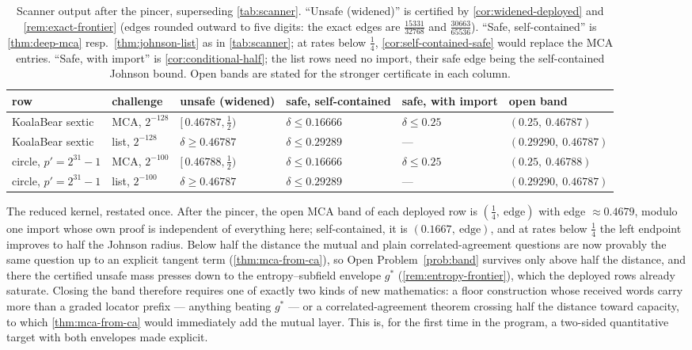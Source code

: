 \documentclass[11pt]{article}
\theoremstyle{definition}
\theoremstyle{remark}
\begin{document}
\begin{table}[t]
\centering\footnotesize
\setlength{\tabcolsep}{4pt}
\begin{tabular}{@{}llllll@{}}
\toprule
row & challenge & unsafe \textup{(widened)} & safe, self-contained & safe, with import & open band \\
\midrule
KoalaBear sextic & MCA, $2^{-128}$ & $[\,0.46787,\tfrac12)$ & $\delta\le0.16666$ & $\delta\le0.25$ & $(0.25,\ 0.46787)$ \\
KoalaBear sextic & list, $2^{-128}$ & $\delta\ge0.46787$ & $\delta\le0.29289$ & --- & $(0.29290,\ 0.46787)$ \\
circle, $p'{=}2^{31}{-}1$ & MCA, $2^{-100}$ & $[\,0.46788,\tfrac12)$ & $\delta\le0.16666$ & $\delta\le0.25$ & $(0.25,\ 0.46788)$ \\
circle, $p'{=}2^{31}{-}1$ & list, $2^{-100}$ & $\delta\ge0.46787$ & $\delta\le0.29289$ & --- & $(0.29290,\ 0.46787)$ \\
\bottomrule
\end{tabular}
\caption{Scanner output after the pincer, superseding \cref{tab:scanner}. ``Unsafe (widened)'' is certified by \cref{cor:widened-deployed} and \cref{rem:exact-frontier} (edges rounded outward to five digits: the exact edges are $\tfrac{15331}{32768}$ and $\tfrac{30663}{65536}$). ``Safe, self-contained'' is \cref{thm:deep-mca} resp.\ \cref{thm:johnson-list} as in \cref{tab:scanner}; at rates below $\tfrac14$, \cref{cor:self-contained-safe} would replace the MCA entries. ``Safe, with import'' is \cref{cor:conditional-half}; the list rows need no import, their safe edge being the self-contained Johnson bound. Open bands are stated for the stronger certificate in each column.}
\label{tab:scanner2}
\end{table}

The reduced kernel, restated once. After the pincer, the open MCA band of each deployed row is $(\tfrac14,\ \text{edge})$ with edge $\approx0.4679$, modulo one import whose own proof is independent of everything here; self-contained, it is $(0.1667,\ \text{edge})$, and at rates below $\tfrac14$ the left endpoint improves to half the Johnson radius. Below half the distance the mutual and plain correlated-agreement questions are now provably the same question up to an explicit tangent term (\cref{thm:mca-from-ca}), so Open Problem~\ref{prob:band} survives only above half the distance, and there the certified unsafe mass presses down to the entropy--subfield envelope $g^*$ (\cref{rem:entropy-frontier}), which the deployed rows already saturate. Closing the band therefore requires one of exactly two kinds of new mathematics: a floor construction whose received words carry more than a graded locator prefix --- anything beating $g^*$ --- or a correlated-agreement theorem crossing half the distance toward capacity, to which \cref{thm:mca-from-ca} would immediately add the mutual layer. This is, for the first time in the program, a two-sided quantitative target with both envelopes made explicit.
\end{document}
